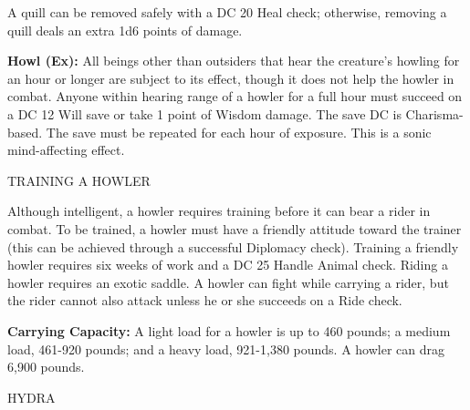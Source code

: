\documentclass{article}
\begin{document}
A quill can be removed safely with a DC 20 Heal check; otherwise, removing a quill 
deals an extra 1d6 points of damage.

\textbf{Howl (Ex):} All beings other than outsiders that hear the creature's howling 
for an hour or longer are subject to its effect, though it does not help the howler 
in combat. Anyone within hearing range of a howler for a full hour must succeed 
on a DC 12 Will save or take 1 point of Wisdom damage. The save DC is Charisma-based. 
The save must be repeated for each hour of exposure. This is a sonic mind-affecting 
effect.

TRAINING A HOWLER

Although intelligent, a howler requires training before it can bear a rider in 
combat. To be trained, a howler must have a friendly attitude toward the trainer 
(this can be achieved through a successful Diplomacy check). Training a friendly 
howler requires six weeks of work and a DC 25 Handle Animal check. Riding a howler 
requires an exotic saddle. A howler can fight while carrying a rider, but the rider 
cannot also attack unless he or she succeeds on a Ride check.

\textbf{Carrying Capacity:} A light load for a howler is up to 460 pounds; a medium 
load, 461-920 pounds; and a heavy load, 921-1,380 pounds. A howler can drag 6,900 
pounds. 

\vspace{12pt}
{\LARGE{}HYDRA}
\end{document}
